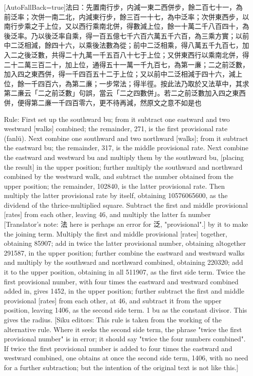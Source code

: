 \documentclass[11pt]{article}
\newcommand{\zhsmall}{\footnotesize\color{black!70}}
\newcommand{\unitlabel}[1]{\marginpar{\raggedleft\tiny\color{gray}#1}}
\newenvironment{unitzh}{\par\CJKfontspec{Noto Serif CJK SC}[AutoFallBack=true]\large\linespread{1.25}\selectfont}{\par}
\newenvironment{uniten}{\par\small\color{black!85}}{\par\medskip}
\begin{document}
\begin{unitzh}\unitlabel{ceyuan-030.26}法曰：先置南行步，内減一東二西併步，餘二百七十一，為前泛率；次併一南二北，内減東行步，餘三百一十七，為中泛率；次併東西步，以南行步乘之于上位，又以西行乘南北併，得數減上位，餘一十萬二千八百四十，為後泛率。乃以後泛率自乘，得一百五億七千六百六萬五千六百，為三乘方實；以前中二泛相減，餘四十六，以乘後法數為從；前中二泛相乘，得八萬五千九百七，加入二之後泛數，共得二十九萬一千五百八十七于上位；又併東西行以乘南北併，得二十二萬三百二十，加上位，通得五十一萬一千九百七，為第一亷；二之前泛數，加入四之東西併，得一千四百五十二于上位；又以前中二泛相減于四十六，減上位，餘一千四百六，為第二亷；一步常法；得半徑。{\zhsmall 按此法乃取於又法草中，其求第二亷云「二之前泛數」句誤，當云「二之四數併」。若二之前泛數加入四之東西併，便得第二亷一千四百零六，更不待再減，然原文之意不如是也}\end{unitzh}
\begin{uniten}Rule: First set up the southward bu; from it subtract one eastward and two westward [walks] combined; the remainder, 271, is the first provisional rate (fanlü). Next combine one southward and two northward [walks]; from it subtract the eastward bu; the remainder, 317, is the middle provisional rate. Next combine the eastward and westward bu and multiply them by the southward bu, [placing the result] in the upper position; further multiply the southward and northward combined by the westward walk, and subtract the number obtained from the upper position; the remainder, 102840, is the latter provisional rate. Then multiply the latter provisional rate by itself, obtaining 10576065600, as the dividend of the thrice-multiplied square. Subtract the first and middle provisional [rates] from each other, leaving 46, and multiply the latter fa number [Translator's note: 法 here is perhaps an error for 泛, "provisional".] by it to make the joining term. Multiply the first and middle provisional [rates] together, obtaining 85907; add in twice the latter provisional number, obtaining altogether 291587, in the upper position; further combine the eastward and westward walks and multiply by the southward and northward combined, obtaining 220320; add it to the upper position, obtaining in all 511907, as the first side term. Twice the first provisional number, with four times the eastward and westward combined added in, gives 1452, in the upper position; further subtract the first and middle provisional [rates] from each other, at 46, and subtract it from the upper position, leaving 1406, as the second side term. 1 bu as the constant divisor. This gives the radius. [Siku editors: This rule is taken from the working of the alternative rule. Where it seeks the second side term, the phrase "twice the first provisional number" is in error; it should say "twice the four numbers combined". If twice the first provisional number is added to four times the eastward and westward combined, one obtains at once the second side term, 1406, with no need for a further subtraction; but the intention of the original text is not like this.]\end{uniten}
\end{document}
